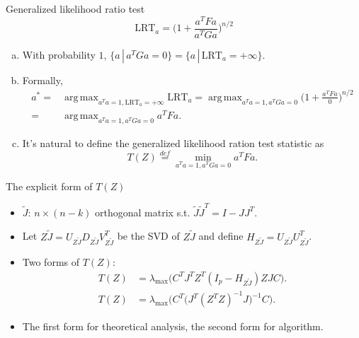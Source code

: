 \documentclass{beamer}
\DeclareMathOperator*{\argmax}{arg\,max}
\theoremstyle{plain}
\theoremstyle{definition}
\theoremstyle{remark}
\begin{document}
\begin{frame}{Generalized likelihood ratio test}
$$
        \text{LRT}_a=\Big(1+\frac{a^T F a}{a^T G a}\Big)^{n/2}
            $$
    \begin{enumerate}[(a)]
        \item
             With probability $1$, $\{a \,|\, a^T G a=0\}= \{a\,|\, \text{LRT}_a=+\infty\}$.
        \item
            Formally, 
            $$
            \begin{aligned}
            a^*=&\argmax_{a^T a=1, \text{LRT}_a=+\infty} \text{LRT}_a=\argmax_{a^T a=1, a^T G a=0}\Big(1+\frac{a^T F a}{0}\Big)^{n/2}\\
            {=}&\argmax_{a^T a=1,a^T G a=0} a^T F a.
            \end{aligned}
            $$
         \item
             It's natural to define the generalized likelihood ration test statistic as
             $$
            T(Z) \stackrel{def}{=}\min_{a^T a=1,a^T G a=0} a^T F a.
             $$

    \end{enumerate}
\end{frame}

\begin{frame}{The explicit form of $T(Z)$}
    \begin{itemize}
        \item
    $\tilde{J}$: $n\times (n-k)$ orthogonal matrix s.t. $\tilde{J}\tilde{J}^T=I-JJ^T$.
\item
            Let $Z \tilde{J}=U_{Z\tilde{J}}D_{Z\tilde{J}}V_{Z\tilde{J}}^T$ be the SVD of $Z \tilde{J}$ and  define $H_{Z\tilde{J}}=U_{Z\tilde{J}}U_{Z\tilde{J}}^T$.
        \item
            Two forms of $T(Z)$:
$$
            \begin{aligned}
            T(Z)&=\lambda_{\max} \big(C^T J^T Z^T (I_p- H_{Z\tilde{J}})ZJC\big).\\
            T(Z)&=\lambda_{\max}\Big(C^T\big(J^T (Z^T Z)^{-1}J\big)^{-1}C\Big).
    \end{aligned}
    $$
\item
    The first form for theoretical analysis, the second form for algorithm.
    \end{itemize}
\end{frame}
\end{document}
